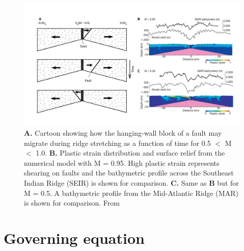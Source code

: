 \documentclass[letterpaper,12pt,notitle]{memphisthesis}                     %
\begin{document}
\begin{figure}[!htb]
	\centering
	\includegraphics[width=0.99\linewidth]{./figs/fig1.pdf}
	\caption{\textbf{A.} Cartoon showing how the hanging-wall block of a fault may migrate during ridge stretching as a function of time for 0.5 $<$ M $<$ 1.0. \textbf{B.} Plastic strain distribution and surface relief from the numerical model with M = 0.95. High plastic strain represents shearing on faults and the bathymetric profile across the Southeast Indian Ridge (SEIR) is shown for comparison. \textbf{C.} Same as \textbf{B} but for M = 0.5. A bathymetric profile from the Mid-Atlantic Ridge (MAR) is shown for comparison. From \citet{Buck2005}}
	\label{fig:mfactor}
\end{figure}


\section{Governing equation}
\end{document}
